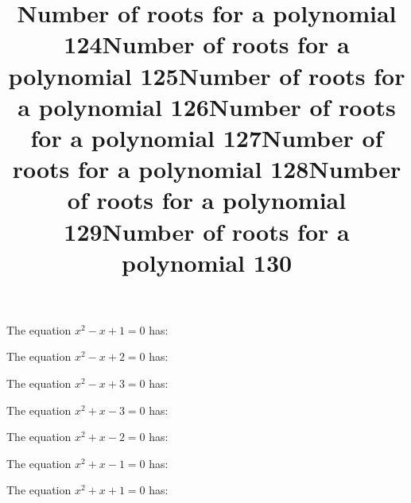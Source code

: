 \documentclass{article}
\begin{document}
\begin{category}
\begin{question}[multichoice]
\end{question}
\begin{question}[multichoice]
\title{Number of roots for a polynomial 124}
The equation $x^{2} - x + 1=0$ has:


\end{question}
\begin{question}[multichoice]
\title{Number of roots for a polynomial 125}
The equation $x^{2} - x + 2=0$ has:


\end{question}
\begin{question}[multichoice]
\title{Number of roots for a polynomial 126}
The equation $x^{2} - x + 3=0$ has:


\end{question}
\begin{question}[multichoice]
\title{Number of roots for a polynomial 127}
The equation $x^{2} + x - 3=0$ has:


\end{question}
\begin{question}[multichoice]
\title{Number of roots for a polynomial 128}
The equation $x^{2} + x - 2=0$ has:


\end{question}
\begin{question}[multichoice]
\title{Number of roots for a polynomial 129}
The equation $x^{2} + x - 1=0$ has:


\end{question}
\begin{question}[multichoice]
\title{Number of roots for a polynomial 130}
The equation $x^{2} + x + 1=0$ has:


\end{question}
\end{category}
\end{document}
